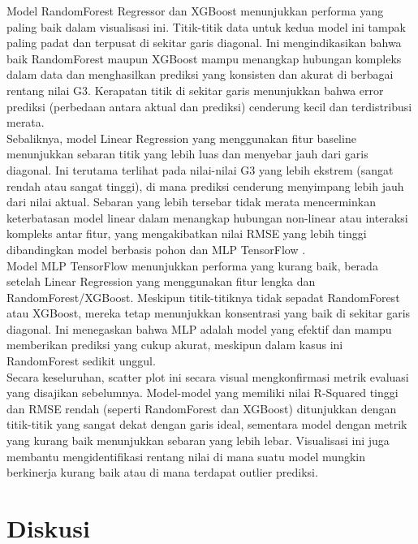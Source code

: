 Model RandomForest Regressor dan XGBoost menunjukkan performa yang paling baik dalam visualisasi ini. Titik-titik data untuk kedua model ini 
tampak paling padat dan terpusat di sekitar garis diagonal. Ini mengindikasikan bahwa baik RandomForest maupun XGBoost mampu menangkap hubungan 
kompleks dalam data dan menghasilkan prediksi yang konsisten dan akurat di berbagai rentang nilai G3. Kerapatan titik di sekitar garis 
menunjukkan bahwa error prediksi (perbedaan antara aktual dan prediksi) cenderung kecil dan terdistribusi merata.\\

Sebaliknya, model Linear Regression yang menggunakan fitur baseline menunjukkan sebaran titik yang lebih luas dan menyebar jauh dari garis 
diagonal. Ini terutama terlihat pada nilai-nilai G3 yang lebih ekstrem (sangat rendah atau sangat tinggi), di mana prediksi cenderung 
menyimpang lebih jauh dari nilai aktual. Sebaran yang lebih tersebar tidak merata mencerminkan keterbatasan model linear dalam menangkap 
hubungan non-linear atau interaksi kompleks antar fitur, yang mengakibatkan nilai RMSE yang lebih tinggi dibandingkan model berbasis pohon dan MLP TensorFlow   .\\

Model MLP TensorFlow menunjukkan performa yang kurang baik, berada setelah Linear Regression yang menggunakan fitur lengka dan RandomForest/XGBoost. Meskipun titik-titiknya tidak 
sepadat RandomForest atau XGBoost, mereka tetap menunjukkan konsentrasi yang baik di sekitar garis diagonal. Ini menegaskan bahwa MLP adalah 
model yang efektif dan mampu memberikan prediksi yang cukup akurat, meskipun dalam kasus ini RandomForest sedikit unggul.\\

Secara keseluruhan, scatter plot ini secara visual mengkonfirmasi metrik evaluasi yang disajikan sebelumnya. Model-model yang memiliki nilai 
R-Squared tinggi dan RMSE rendah (seperti RandomForest dan XGBoost) ditunjukkan dengan titik-titik yang sangat dekat dengan garis ideal, 
sementara model dengan metrik yang kurang baik menunjukkan sebaran yang lebih lebar. Visualisasi ini juga membantu mengidentifikasi rentang 
nilai di mana suatu model mungkin berkinerja kurang baik atau di mana terdapat outlier prediksi.



\chapter*{Diskusi}


